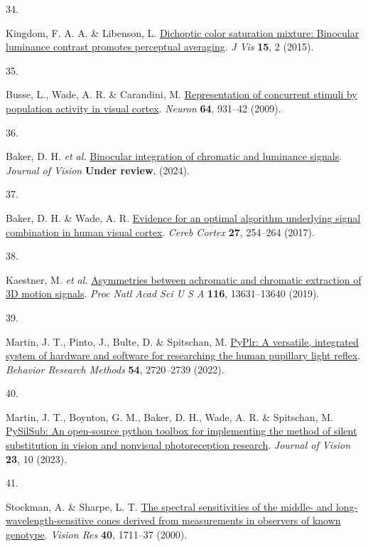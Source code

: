 \documentclass[
]{article}
\newlength{\cslhangindent}
\newlength{\csllabelwidth}
\newenvironment{CSLReferences}[2] %
 {\begin{list}{}{%
  \setlength{\itemindent}{0pt}
  \setlength{\leftmargin}{0pt}
  \setlength{\parsep}{0pt}
  \ifodd #1
   \setlength{\leftmargin}{\cslhangindent}
   \setlength{\itemindent}{-1\cslhangindent}
  \fi
  \setlength{\itemsep}{#2\baselineskip}}}
 {\end{list}}
\newcommand{\CSLLeftMargin}[1]{\parbox[t]{\csllabelwidth}{\strut#1\strut}}
\newcommand{\CSLRightInline}[1]{\parbox[t]{\linewidth - \csllabelwidth}{\strut#1\strut}}
\begin{document}
\begin{CSLReferences}{0}{0}
\CSLLeftMargin{34. }%
\CSLRightInline{Kingdom, F. A. A. \& Libenson, L. \href{https://doi.org/10.1167/15.5.2}{Dichoptic color saturation mixture: Binocular luminance contrast promotes perceptual averaging}. \emph{J Vis} \textbf{15}, 2 (2015).}

\CSLLeftMargin{35. }%
\CSLRightInline{Busse, L., Wade, A. R. \& Carandini, M. \href{https://doi.org/10.1016/j.neuron.2009.11.004}{Representation of concurrent stimuli by population activity in visual cortex}. \emph{Neuron} \textbf{64}, 931--42 (2009).}

\CSLLeftMargin{36. }%
\CSLRightInline{Baker, D. H. \emph{et al.} \href{https://doi.org/10.31234/osf.io/atsfh}{Binocular integration of chromatic and luminance signals}. \emph{Journal of Vision} \textbf{Under review}, (2024).}

\CSLLeftMargin{37. }%
\CSLRightInline{Baker, D. H. \& Wade, A. R. \href{https://doi.org/10.1093/cercor/bhw395}{Evidence for an optimal algorithm underlying signal combination in human visual cortex}. \emph{Cereb Cortex} \textbf{27}, 254--264 (2017).}

\CSLLeftMargin{38. }%
\CSLRightInline{Kaestner, M. \emph{et al.} \href{https://doi.org/10.1073/pnas.1817202116}{Asymmetries between achromatic and chromatic extraction of 3D motion signals}. \emph{Proc Natl Acad Sci U S A} \textbf{116}, 13631--13640 (2019).}

\CSLLeftMargin{39. }%
\CSLRightInline{Martin, J. T., Pinto, J., Bulte, D. \& Spitschan, M. \href{https://doi.org/10.3758/s13428-021-01759-3}{PyPlr: A versatile, integrated system of hardware and software for researching the human pupillary light reflex}. \emph{Behavior Research Methods} \textbf{54}, 2720--2739 (2022).}

\CSLLeftMargin{40. }%
\CSLRightInline{Martin, J. T., Boynton, G. M., Baker, D. H., Wade, A. R. \& Spitschan, M. \href{https://doi.org/10.1167/jov.23.7.10}{PySilSub: An open-source python toolbox for implementing the method of silent substitution in vision and nonvisual photoreception research}. \emph{Journal of Vision} \textbf{23}, 10 (2023).}

\CSLLeftMargin{41. }%
\CSLRightInline{Stockman, A. \& Sharpe, L. T. \href{https://doi.org/10.1016/s0042-6989(00)00021-3}{The spectral sensitivities of the middle- and long-wavelength-sensitive cones derived from measurements in observers of known genotype}. \emph{Vision Res} \textbf{40}, 1711--37 (2000).}


\end{CSLReferences}
\end{document}
